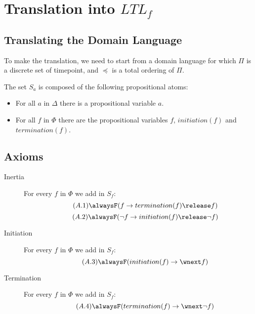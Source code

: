\section{Translation into $LTL_f$}\label{sec:translation}

\subsection{Translating the Domain Language}\label{sec:trans_dom_ltl}

To make the translation, we need to start from a domain language for which $\Pi$ is a discrete set of timepoint, and $\preceq$ is a total ordering of $\Pi$.

The set $S_a$ is composed of the following propositional atoms:

\begin{itemize}
  \item For all $a$ in $\Delta$ there is a propositional variable $a$.
  \item For all $f$ in $\Phi$ there are the propositional variables $f$, $initiation(f)$ and $termination(f)$.
\end{itemize}

\subsection{Axioms}\label{sec:trans_ax_ltl}

\begin{description}
  \item[Inertia]
  For every $f$ in $\Phi$ we add in $S_f$:
  \begin{equation}\tag{$A.1$}
    \alwaysF(f\rightarrow termination(f) \release f)
  \end{equation}
  \begin{equation}\tag{$A.2$}
    \alwaysF(\neg f\rightarrow initiation(f) \release \neg f)
  \end{equation}
  \item[Initiation]
  For every $f$ in $\Phi$ we add in $S_f$:
  \begin{equation}\tag{$A.3$}
    \alwaysF(initiation(f)\rightarrow\wnext f)
  \end{equation}
  \item[Termination]
  For every $f$ in $\Phi$ we add in $S_f$:
  \begin{equation}\tag{$A.4$}
    \alwaysF(termination(f)\rightarrow\wnext \neg f)
  \end{equation}
\end{description}

